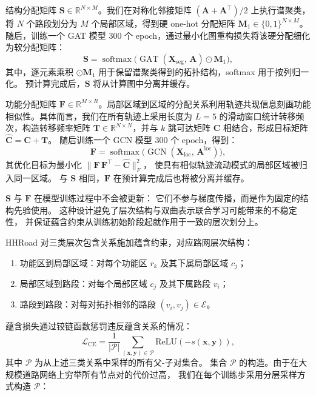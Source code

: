 结构分配矩阵 $\mathbf{S} \in \mathbb{R}^{N \times M}$。我们在对称化邻接矩阵 $(\mathbf{A} + \mathbf{A}^\top)/2$ 上执行谱聚类，
将 $N$ 个路段划分为 $M$ 个局部区域，得到硬 one-hot 分配矩阵 $\mathbf{M}_1 \in \{0,1\}^{N \times M}$。
随后，训练一个 GAT 模型 300 个 epoch，通过最小化图重构损失将该硬分配细化为软分配矩阵：
\begin{equation}\label{eq:struct_assign}
  \mathbf{S} = \operatorname{softmax}\!\bigl(\operatorname{GAT}(\mathbf{X}_{\text{seg}},\, \mathbf{A}) \odot \mathbf{M}_1\bigr),
\end{equation}
其中，逐元素乘积 $\odot \mathbf{M}_1$ 用于保留谱聚类得到的拓扑结构，softmax 用于按列归一化。
预计算完成后，$\mathbf{S}$ 将从计算图中分离并缓存。

功能分配矩阵 $\mathbf{F} \in \mathbb{R}^{M \times R}$。局部区域到区域的分配关系利用轨迹共现信息刻画功能相似性。具体而言，我们在所有轨迹上采用长度为 $L{=}5$ 的滑动窗口统计转移频次，构造转移频率矩阵 $\mathbf{T} \in \mathbb{R}^{N \times N}$，并与 $k$ 跳可达矩阵 $\mathbf{C}$ 相结合，形成目标矩阵 $\hat{\mathbf{C}} = \mathbf{C} + \mathbf{T}$。
随后训练一个 GCN 模型 300 个 epoch，得到：
\begin{equation}\label{eq:fnc_assign}
  \mathbf{F} = \operatorname{softmax}\!\bigl(\operatorname{GCN}(\mathbf{X}_{\text{loc}},\, \mathbf{A}^{\text{loc}})\bigr),
\end{equation}
其优化目标为最小化 $\|\mathbf{F}\,\mathbf{F}^\top - \hat{\mathbf{C}}\|_F^2$，
使具有相似轨迹流动模式的局部区域被归入同一区域。
与 $\mathbf{S}$ 相同，$\mathbf{F}$ 在预计算完成后也将被分离并缓存。

$\mathbf{S}$ 与 $\mathbf{F}$ 在模型训练过程中不会被更新：
它们不参与梯度传播，而是作为固定的结构先验使用。
这种设计避免了层次结构与双曲表示联合学习可能带来的不稳定性，
并保证蕴含约束从训练初始阶段起就作用于一致的层次划分上。

HHRoad 对三类层次包含关系施加蕴含约束，对应路网层次结构：
\begin{enumerate}[label=(\arabic*)]
    \item 功能区到局部区域：对每个功能区 $r_k$ 及其下属局部区域 $c_j$；
    \item 局部区域到路段：对每个局部区域 $c_j$ 及其下属路段 $v_i$；
    \item 路段到路段：对每对拓扑相邻的路段 $(v_i, v_j) \in \mathcal{E}$。
\end{enumerate}
蕴含损失通过铰链函数惩罚违反蕴含关系的情况：
\begin{equation}
    \mathcal{L}_{\text{CE}} = \frac{1}{|\mathcal{P}|}
    \sum_{(\mathbf{x}, \mathbf{y}) \in \mathcal{P}}
    \text{ReLU}\!\left(-s(\mathbf{x}, \mathbf{y})\right),
    \label{eq:loss_ce}
\end{equation}
其中 $\mathcal{P}$ 为从上述三类关系中采样的所有父-子对集合。
集合 $\mathcal{P}$ 的构造。由于在大规模道路网络上穷举所有节点对的代价过高，
我们在每个训练步采用分层采样方式构造 $\mathcal{P}$：

